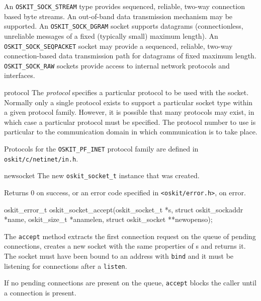 \begin{apiparm}
	An \texttt{OSKIT_SOCK_STREAM} type provides sequenced, reliable, two-way
	connection based byte streams.  An out-of-band data transmission 
	mechanism may be supported.  An \texttt{OSKIT_SOCK_DGRAM} socket supports
	datagrams (connectionless, unreliable messages of a fixed (typically 
	small) maximum length).
	An \texttt{OSKIT_SOCK_SEQPACKET} socket may provide a sequenced, 
	reliable, two-way connection-based data transmission path for
	datagrams of fixed maximum length.
	\texttt{OSKIT_SOCK_RAW} sockets provide access to internal network 
	protocols and interfaces.

	\item[protocol]
	The \emph{protocol} specifies a particular protocol to be used with the
	socket.
	Normally only a single protocol exists to support a particular socket
	type within a given protocol family.  However, it is possible that 
	many protocols may exist, in which case a particular protocol must 
	be specified. The protocol number to use is particular to the
	communication domain in which communication is to take place.

	Protocols for the \texttt{OSKIT_PF_INET} protocol family are defined 
	in \texttt{oskit/c/netinet/in.h}.

	\item[newsocket] The new \texttt{oskit_socket_t} instance that
		was created.
\end{apiparm}

\begin{apiret}
	Returns 0 on success, or an error code specified in
	{\tt <oskit/error.h>}, on error.
\end{apiret}

%
%

\begin{apisyn}

	\funcproto oskit_error_t
	oskit_socket_accept(oskit_socket_t *s, 
		\outparam struct oskit_sockaddr *name,
		\inoutparam oskit_size_t *anamelen,
		\outparam struct oskit_socket **newopenso);
\end{apisyn}

\begin{apidesc}
	The \texttt{accept} method extracts the first connection request
	on the queue of pending connections, creates a new socket 
	with the same properties of s and returns it.
	The socket must have been bound to an address with \texttt{bind}
	and it must be listening for connections after a \texttt{listen}.

	If no pending connections are present on the queue, \texttt{accept} 
	blocks the caller until a connection is present.
\end{apidesc}

